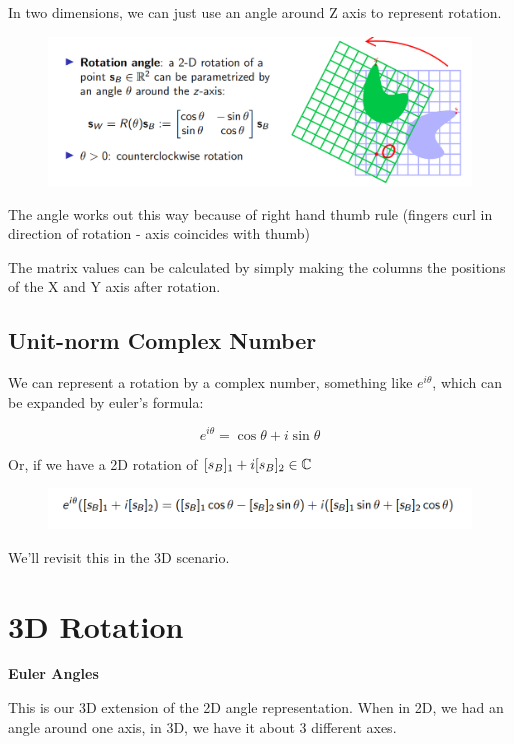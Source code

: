 In two dimensions, we can just use an angle around Z axis to represent rotation.

\begin{figure}[h]\centering\includegraphics[width=12cm]{img/j_3_4.png}\end{figure}

The angle works out this way because of right hand thumb rule (fingers curl in direction of rotation - axis coincides with thumb)

The matrix values can be calculated by simply making the columns the positions of the X and Y axis after rotation.

\subsection{Unit-norm Complex Number}

We can represent a rotation by a complex number, something like $e^{i\theta}$, which can be expanded by euler's formula:

\begin{equation*}
    e^{i\theta} = \cos\theta + i\sin\theta
\end{equation*}

Or, if we have a 2D rotation of $[s_B]_1 + i[s_B]_2\in \mathbb{C}$

\begin{figure}[h]\centering\includegraphics[width=12cm]{img/j_3_5.png}\end{figure}

We'll revisit this in the 3D scenario.

\section{3D Rotation}

\textbf{Euler Angles}

This is our 3D extension of the 2D angle representation. When in 2D, we had an angle around one axis, in 3D, we have it about 3 different axes.

